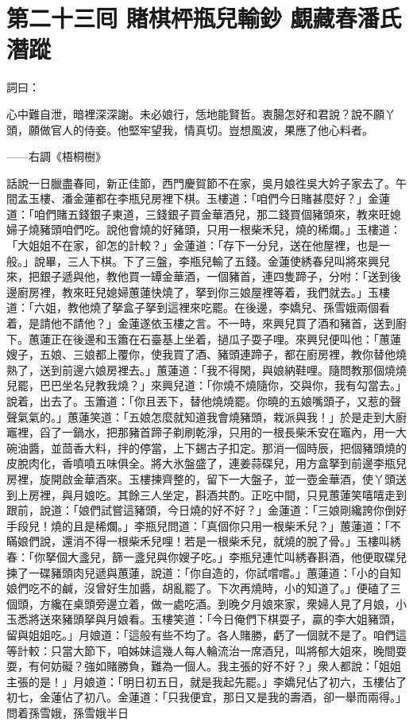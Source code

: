 
\chapter*{第二十三囘 賭棋枰瓶兒輸鈔 覷藏春潘氏潛蹤}


詞曰：

心中難自泄，暗裡深深謝。未必娘行，恁地能賢哲。衷腸怎好和君說？說不願丫頭，願做官人的侍妾。他堅牢望我，情真切。豈想風波，果應了他心料者。

——右調《梧桐樹》

話說一日臘盡春囘，新正佳節，西門慶賀節不在家，吳月娘徃吳大妗子家去了。午間孟玉樓、潘金蓮都在李瓶兒房裡下棋。玉樓道：「咱們今日賭甚麼好？」金蓮道：「咱們賭五錢銀子東道，三錢銀子買金華酒兒，那二錢買個豬頭來，教來旺媳婦子燒豬頭咱們吃。說他會燒的好豬頭，只用一根柴禾兒，燒的稀爛。」玉樓道：「大姐姐不在家，卻怎的計較？」金蓮道：「存下一分兒，送在他屋裡，也是一般。」說畢，三人下棋。下了三盤，李瓶兒輸了五錢。{}金蓮使綉春兒叫將來興兒來，把銀子遞與他，教他買一罈金華酒，一個豬首，連四隻蹄子，分咐：「送到後邊廚房裡，教來旺兒媳婦蕙蓮快燒了，拏到你三娘屋裡等着，我們就去。」玉樓道：「六姐，教他燒了拏盒子拏到這裡來吃罷。在後邊，李嬌兒、孫雪娥兩個看着，是請他不請他？」{}金蓮遂依玉樓之言。不一時，來興兒買了酒和豬首，送到廚下。蕙蓮正在後邊和玉簫在石臺基上坐着，撾瓜子耍子哩。來興兒便叫他：「蕙蓮嫂子，五娘、三娘都上覆你，使我買了酒、豬頭連蹄子，都在廚房裡，教你替他燒熟了，送到前邊六娘房裡去。」蕙蓮道：「我不得閑，與娘納鞋哩。隨問教那個燒燒兒罷，巴巴坐名兒教我燒？」來興兒道：「你燒不燒隨你，交與你，我有勾當去。」說着，出去了。玉簫道：「你且丟下，替他燒燒罷。你曉的五娘嘴頭子，又惹的聲聲氣氣的。」蕙蓮笑道：「五娘怎麼就知道我會燒豬頭，栽派與我！」於是走到大廚竈裡，舀了一鍋水，把那豬首蹄子剃刷乾淨，只用的一根長柴禾安在竈內，用一大碗油醬，並茴香大料，拌的停當，上下錫古子扣定。那消一個時辰，把個豬頭燒的皮脫肉化，香噴噴五味俱全。將大氷盤盛了，連姜蒜碟兒，用方盒拏到前邊李瓶兒房裡，旋開啟金華酒來。玉樓揀齊整的，留下一大盤子，並一壺金華酒，使丫頭送到上房裡，與月娘吃。其餘三人坐定，斟酒共酌。正吃中間，只見蕙蓮笑嘻嘻走到跟前，說道：「娘們試嘗這豬頭，今日燒的好不好？」金蓮道：「三娘剛纔誇你倒好手段兒！燒的且是稀爛。」李瓶兒問道：「真個你只用一根柴禾兒？」蕙蓮道：「不瞞娘們說，還消不得一根柴禾兒哩！若是一根柴禾兒，就燒的脫了骨。」玉樓叫綉春：「你拏個大盞兒，篩一盞兒與你嫂子吃。」李瓶兒連忙叫綉春斟酒，他便取碟兒揀了一碟豬頭肉兒遞與蕙蓮，說道：「你自造的，你試嚐嚐。」蕙蓮道：「小的自知娘們吃不的鹹，沒曾好生加醬，胡亂罷了。下次再燒時，小的知道了。」{}便磕了三個頭，方纔在桌頭旁邊立着，做一處吃酒。到晚夕月娘來家，衆婦人見了月娘，小玉悉將送來豬頭拏與月娘看。玉樓笑道：「今日俺們下棋耍子，贏的李大姐豬頭，留與姐姐吃。」月娘道：「這般有些不均了。各人賭勝，虧了一個就不是了。咱們這等計較：只當大節下，咱姊妹這幾人每人輪流治一席酒兒，叫將郁大姐來，晚間耍耍，有何妨礙？強如賭勝負，難為一個人。我主張的好不好？」衆人都說：「姐姐主張的是！」月娘道：「明日初五日，就是我起先罷。」李嬌兒佔了初六，玉樓佔了初七，金蓮佔了初八。金蓮道：「只我便宜，那日又是我的壽酒，卻一舉而兩得。」問着孫雪娥，孫雪娥半日